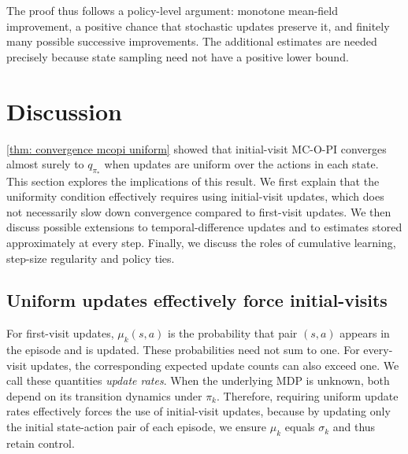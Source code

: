 \documentclass[twoside,11pt]{article}
\newcommand{\pol}{\pi}
\newcommand{\qval}{q}
\newcommand{\qopt}{\qval_{\best{\pol}}}
\newcommand{\best}[1]{{#1}_*}
\DeclareRobustCommand{\reviewbarstart}{%
  \ifhmode %
    \vadjust{\vbox to 0pt{%
      \vskip-\ht\strutbox %
      \vskip-\dp\strutbox %
      \cbstart[\changebarwidth] %
      \vss %
    }}%
  \else %
    \cbstart[\changebarwidth]%
  \fi %
} %
\providecommand{\DIFadd}[1]{#1} %
\providecommand{\DIFaddbegin}{\reviewbarstart} %
\providecommand{\DIFaddend}{\protect\cbend} %
\def\DIFadd#1{#1}%
\def\DIFaddbegin{}%
\def\DIFaddend{}%
\begin{document}
The  \DIFaddbegin \DIFadd{proof thus follows a }\DIFaddend policy-level  \DIFaddbegin \DIFadd{argument: monotone mean-field improvement, a positive chance that stochastic updates preserve it, and finitely many possible successive improvements. The additional estimates are needed precisely because state sampling need not have a positive lower bound.
}

\DIFaddend %
\section{Discussion}
\label{sec: discussion}

\autoref{thm: convergence mcopi uniform} showed that initial-visit MC-O-PI converges almost surely to $\qopt$ 
when updates are uniform over the actions in each state.
% 
% 
This section explores the implications of this result.
We first explain that the uniformity condition effectively requires using initial-visit updates, which does not necessarily slow down convergence compared to first-visit updates.
We then  \DIFaddbegin \DIFadd{discuss possible extensions to }\DIFaddend temporal-difference updates  \DIFaddbegin \DIFadd{and to estimates }\DIFaddend stored approximately at every step.
Finally, we  \DIFaddbegin \DIFadd{discuss the roles of cumulative learning, step-size regularity and policy ties}\DIFaddend .




\subsection{Uniform updates effectively force initial-visits}


\DIFaddbegin \DIFadd{For first-visit updates, $\mu_k(s,a)$ is the probability that pair $(s,a)$ appears in the episode and is updated. These probabilities need not sum to one. For every-visit updates, the corresponding expected update counts can also exceed one. We call these quantities \emph{update rates}. }\DIFaddend When the underlying MDP is unknown,  \DIFaddbegin \DIFadd{both depend on its transition dynamics under }\DIFaddend $\pi_k$.
Therefore, requiring uniform update  \DIFaddbegin \DIFadd{rates }\DIFaddend effectively forces the use of initial-visit updates,
because by updating only the initial state-action pair of each episode, we ensure $\mu_k$ equals $\sigma_k$ and thus retain control.
\end{document}
